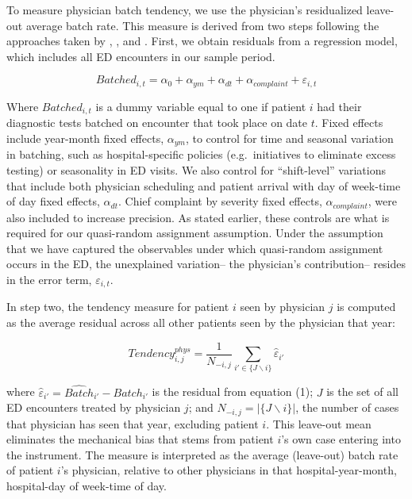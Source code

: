 \documentclass[,,nonblindrev]{informs}
\begin{document}
To measure physician batch tendency, we use the physician's residualized
leave-out average batch rate. This measure is derived from two steps
following the approaches taken by \citet{doyle2015measuring},
\citet{dobbie2018effects}, and \citet{eichmeyer2022pathways}. First, we
obtain residuals from a regression model, which includes all ED
encounters in our sample period.

\begin{equation}
Batched_{i,t} = \alpha_0 + \alpha_{ym} + \alpha_{dt} + \alpha_{complaint} + \varepsilon_{i,t}
\end{equation}

Where \(Batched_{i,t}\) is a dummy variable equal to one if patient
\(i\) had their diagnostic tests batched on encounter that took place on
date \(t\). Fixed effects include year-month fixed effects,
\(\alpha_{ym}\), to control for time and seasonal variation in batching,
such as hospital-specific policies (e.g.~initiatives to eliminate excess
testing) or seasonality in ED visits. We also control for
``shift-level'' variations that include both physician scheduling and
patient arrival with day of week-time of day fixed effects,
\(\alpha_{dt}\). Chief complaint by severity fixed effects,
\(\alpha_{complaint}\), were also included to increase precision. As
stated earlier, these controls are what is required for our quasi-random
assignment assumption. Under the assumption that we have captured the
observables under which quasi-random assignment occurs in the ED, the
unexplained variation-- the physician's contribution-- resides in the
error term, \(\varepsilon_{i,t}\).

In step two, the tendency measure for patient \(i\) seen by physician
\(j\) is computed as the average residual across all other patients seen
by the physician that year:

\begin{equation}
Tendency_{i,j}^{phys} =
\frac{1}{N_{-i,j}} \sum_{i' \in \{J \backslash i\}}\hat{\varepsilon}_{i'}
\end{equation}

where \(\hat{\varepsilon}_{i'} = \hat{Batch}_{i'} - Batch_{i'}\) is the
residual from equation (1); \(J\) is the set of all ED encounters
treated by physician \(j\); and \(N_{-i,j} = |\{J \backslash i\}|\), the
number of cases that physician has seen that year, excluding patient
\(i\). This leave-out mean eliminates the mechanical bias that stems
from patient \(i\)'s own case entering into the instrument. The measure
is interpreted as the average (leave-out) batch rate of patient \(i\)'s
physician, relative to other physicians in that hospital-year-month,
hospital-day of week-time of day.
\end{document}
